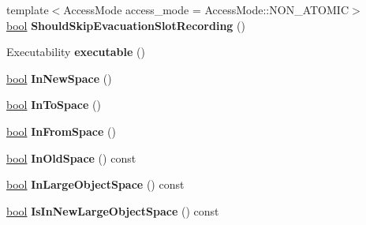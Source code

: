 \begin{DoxyCompactItemize}
\item 
\mbox{\label{classv8_1_1internal_1_1MemoryChunk_a91aaba64cd0e95a140b04aaf601193d2}} 
{\footnotesize template$<$Access\+Mode access\+\_\+mode = Access\+Mode\+::\+N\+O\+N\+\_\+\+A\+T\+O\+M\+IC$>$ }\\\mbox{\hyperlink{classbool}{bool}} {\bfseries Should\+Skip\+Evacuation\+Slot\+Recording} ()
\item 
\mbox{\label{classv8_1_1internal_1_1MemoryChunk_a09a81cd757b38893db3e4bef37dbdf0b}} 
Executability {\bfseries executable} ()
\item 
\mbox{\label{classv8_1_1internal_1_1MemoryChunk_a440a5fbf7b463a4762b6ee1e73224ac7}} 
\mbox{\hyperlink{classbool}{bool}} {\bfseries In\+New\+Space} ()
\item 
\mbox{\label{classv8_1_1internal_1_1MemoryChunk_ab6ab9770e08a7a9c80a2e64a180ee98e}} 
\mbox{\hyperlink{classbool}{bool}} {\bfseries In\+To\+Space} ()
\item 
\mbox{\label{classv8_1_1internal_1_1MemoryChunk_aab8369550d359793e8d5d1dd0389389a}} 
\mbox{\hyperlink{classbool}{bool}} {\bfseries In\+From\+Space} ()
\item 
\mbox{\label{classv8_1_1internal_1_1MemoryChunk_a4d298402468a65b1dc79ba9f9f8d9ecb}} 
\mbox{\hyperlink{classbool}{bool}} {\bfseries In\+Old\+Space} () const
\item 
\mbox{\label{classv8_1_1internal_1_1MemoryChunk_a2babb4117b123c3f361e0f24dedb0ce9}} 
\mbox{\hyperlink{classbool}{bool}} {\bfseries In\+Large\+Object\+Space} () const
\item 
\mbox{\label{classv8_1_1internal_1_1MemoryChunk_a7365e46550cd9c626879628ef35adebc}} 
\mbox{\hyperlink{classbool}{bool}} {\bfseries Is\+In\+New\+Large\+Object\+Space} () const
\item 
\mbox{\label{classv8_1_1internal_1_1MemoryChunk_a8b949ff9de2f2bd9cdcd5070d7c5e591}} 

\end{DoxyCompactItemize}
